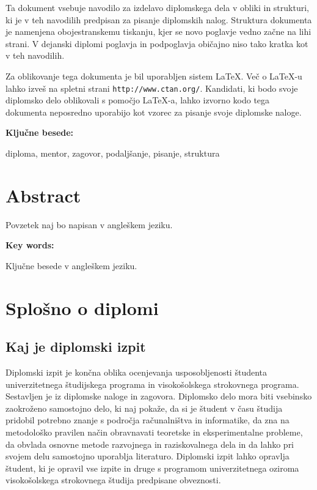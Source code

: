 \documentclass[12pt,a4paper]{book}
\begin{document}
Ta dokument vsebuje navodilo za izdelavo diplomskega dela v obliki in strukturi, ki je v teh navodilih predpisan za
pisanje diplomskih nalog. Struktura dokumenta je namenjena obojestranskemu tiskanju, kjer se novo poglavje vedno za\v cne na lihi strani.
V dejanski diplomi poglavja in podpogla\-vja  obi\v cajno niso tako kratka kot v teh navodilih.

Za oblikovanje tega dokumenta je bil uporabljen sistem \LaTeX.
Ve\v c o \LaTeX-u lahko izve\v s na spletni strani \texttt{http://www.ctan.org/}.
Kandidati, ki bodo svoje diplomsko delo oblikovali s pomo\v cjo
\LaTeX-a, lahko izvorno kodo tega dokumenta neposredno uporabijo kot vzorec za pisanje svoje diplomske naloge.

\vspace{1.3cm}
\noindent
{\large \bf Ključne besede:}

\vspace{0.5cm}
\noindent
diploma, mentor, zagovor, podaljšanje, pisanje, struktura


\chapter*{Abstract}


Povzetek naj bo napisan v angleškem jeziku.

\vspace{1.3cm}
\noindent
{\large \bf Key words:}

\vspace{0.5cm}
\noindent
Ključne besede v angleškem jeziku.



\chapter{Splošno o diplomi}

\section{Kaj je diplomski izpit}
Diplomski izpit je končna oblika ocenjevanja usposobljenosti študenta univerzitetnega študijskega programa in visokošolskega
strokovnega programa. Sestavljen je iz diplomske naloge in zagovora. Diplomsko delo mora biti vsebinsko zaokroženo samostojno delo, ki naj
pokaže, da si je študent v času študija pridobil potrebno znanje s področja računalništva in informatike, da zna na metodološko pravilen način
obravnavati teoretske in eksperimentalne probleme, da obvlada osnovne metode razvojnega in raziskovalnega dela in da lahko pri svojem delu
samostojno uporablja literaturo. Diplomski izpit lahko opravlja študent, ki je opravil vse izpite in druge s programom univerzitetnega oziroma
visokošolskega strokovnega študija predpisane obveznosti. 
\end{document}
